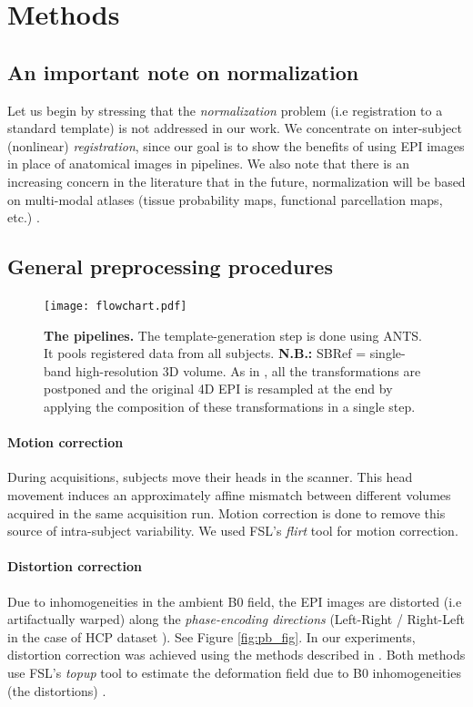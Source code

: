 \section{Methods}
\subsection{An important note on normalization}
Let us begin by stressing that the \textit{normalization} problem (i.e
registration to a standard template) is not addressed in our work. We
concentrate on inter-subject (nonlinear) \textit{registration}, since
our goal is to show the benefits of using EPI images in place of
anatomical images in pipelines. 
%
We also note that there is an increasing concern in the literature
that in the future, normalization will be based on multi-modal atlases
(tissue probability maps, functional parcellation maps, etc.)
\citep{pmid24936682}.
\subsection{General preprocessing procedures}
\begin{figure}[!htpb]
     \texttt{[image: flowchart.pdf]}
\caption{\textbf{The pipelines.} The template-generation step is done using ANTS. It pools registered data from all subjects. \textbf{N.B.:} SBRef = single-band high-resolution 3D volume. As in \citep{glasser2013}, all the transformations are postponed and the original 4D EPI is resampled at the end by applying the composition of these transformations in a single step.}
\label{fig:pipelines}
\end{figure}

\label{sec:gen_proc}
\paragraph{Motion correction}
During acquisitions, subjects move their heads in the
scanner. This head movement induces an approximately affine mismatch
between different volumes acquired in the same acquisition
run. Motion correction is done to remove this source of intra-subject
variability.
We used FSL's \textit{flirt} tool \citep{smith2004} for motion correction.

\paragraph{Distortion correction}
\label{sec:dc}
Due to inhomogeneities in the ambient B0 field,
the EPI images are distorted (i.e artifactually warped) along the \textit{phase-encoding
  directions} (Left-Right / Right-Left in the case of HCP dataset
\citep{VanEssen20122222}). See Figure \ref{fig:pb_fig}. In our
experiments, distortion correction \citep{pmid9178246,pmid12270226,zeng2002,anderson2003,jezzard1995correction,wan1997reduction} was
achieved using %
the methods described in \citep{VanEssen20122222}. %
Both methods use  FSL's \textit{topup} tool \citep{smith2004} to
estimate the deformation field due to B0 inhomogeneities (the
distortions) \citep{glasser2013}.

